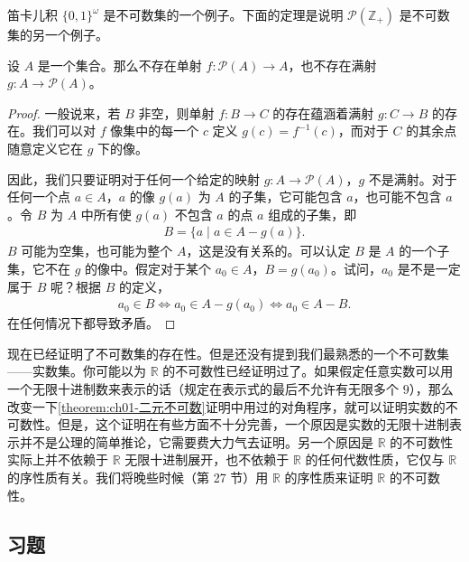 \documentclass[../../main.tex]{subfiles}
\begin{document}
笛卡儿积 $\{0, 1\}^{\omega}$ 是不可数集的一个例子。下面的定理是说明 $\mathcal{P}(\mathbb{Z}_{+})$ 是不可数集的另一个例子。

\begin{theorem}[Cantor 定理]\label{theorem:ch01-Cantor}
设 $A$ 是一个集合。那么不存在单射 $f: \mathcal{P}(A) \longrightarrow A$，也不存在满射 $g: A \longrightarrow \mathcal{P}(A)$。
\end{theorem}

\begin{proof}
一般说来，若 $B$ 非空，则单射 $f: B \longrightarrow C$ 的存在蕴涵着满射 $g: C \longrightarrow B$ 的存在。我们可以对 $f$ 像集中的每一个 $c$ 定义 $g(c) = f^{-1}(c)$，而对于 $C$ 的其余点随意定义它在 $g$ 下的像。

因此，我们只要证明对于任何一个给定的映射 $g: A \longrightarrow \mathcal{P}(A)$，$g$ 不是满射。对于任何一个点 $a \in A$，$a$ 的像 $g(a)$ 为 $A$ 的子集，它可能包含 $a$，也可能不包含 $a$。令 $B$ 为 $A$ 中所有使 $g(a)$ 不包含 $a$ 的点 $a$ 组成的子集，即
\begin{align*}
B = \{a \mid a \in A - g(a)\}.
\end{align*}
$B$ 可能为空集，也可能为整个 $A$，这是没有关系的。可以认定 $B$ 是 $A$ 的一个子集，它不在 $g$ 的像中。假定对于某个 $a_{0} \in A$，$B = g(a_{0})$。试问，$a_{0}$ 是不是一定属于 $B$ 呢？根据 $B$ 的定义，
\begin{align*}
a_{0} \in B \Longleftrightarrow a_{0} \in A - g(a_{0}) \Longleftrightarrow a_{0} \in A - B.
\end{align*}
在任何情况下都导致矛盾。
\end{proof}

现在已经证明了不可数集的存在性。但是还没有提到我们最熟悉的一个不可数集——实数集。你可能以为 $\mathbb{R}$ 的不可数性已经证明过了。如果假定任意实数可以用一个无限十进制数来表示的话（规定在表示式的最后不允许有无限多个 $9$），那么改变一下\cref{theorem:ch01-二元不可数}证明中用过的对角程序，就可以证明实数的不可数性。但是，这个证明在有些方面不十分完善，一个原因是实数的无限十进制表示并不是公理的简单推论，它需要费大力气去证明。另一个原因是 $\mathbb{R}$ 的不可数性实际上并不依赖于 $\mathbb{R}$ 无限十进制展开，也不依赖于 $\mathbb{R}$ 的任何代数性质，它仅与 $\mathbb{R}$ 的序性质有关。我们将晚些时候（第 27 节）用 $\mathbb{R}$ 的序性质来证明 $\mathbb{R}$ 的不可数性。

\subsection*{习题}
\end{document}
